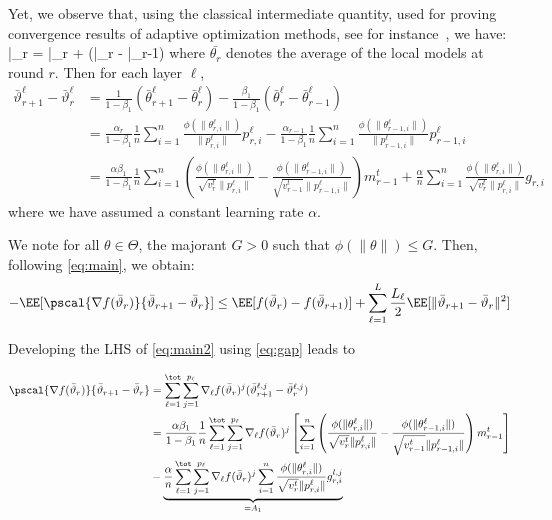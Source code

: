 \documentclass{article}
\begin{document}
Yet, we observe that, using the classical intermediate quantity, used for proving convergence results of adaptive optimization methods, see for instance~\citep{RKK18}, we have:
\beq\label{eq:defseq}
\bar{\vartheta}_r = \bar{\theta}_r +  (\bar{\theta}_{r} - \bar{\theta}_{r-1})
\eeq
where $\bar{\theta_r}$ denotes the average of the local models at round $r$.
Then for each layer $\ell$,
\begin{align}\label{eq:gap}
\bar{\vartheta}^\ell_{r+1} - \bar{\vartheta}^\ell_r  & = \frac{1}{1-\beta_1}(\bar{\theta}^\ell_{r+1} - \bar{\theta}^\ell_{r}) - \frac{\beta_1}{1-\beta_1}(\bar{\theta}^\ell_{r} - \bar{\theta}^\ell_{r-1})\\
& = \frac{\alpha_{r}}{1-\beta_1} \frac{1}{n} \sum_{i = 1}^n \frac{\phi(\|\theta_{r,i}^{\ell}\|)}{\|p_{r,i}^{\ell}\|} p_{r,i}^{\ell}  - \frac{\alpha_{r-1}}{1-\beta_1} \frac{1}{n} \sum_{i = 1}^n \frac{\phi(\|\theta_{r-1,i}^{\ell}\|)}{\|p_{r-1,i}^{\ell}\|} p_{r-1,i}^{\ell}\\
& = \frac{\alpha \beta_1}{1-\beta_1} \frac{1}{n}  \sum_{i = 1}^n  \left( \frac{\phi(\|\theta_{r,i}^{\ell}\|)}{\sqrt{v^{t}_{r}} \|p_{r,i}^{\ell}\|} - \frac{\phi(\|\theta_{r-1,i}^{\ell}\|)}{\sqrt{v^{t}_{r-1}} \|p_{r-1,i}^{\ell}\|} \right) m^{t}_{r-1} + \frac{\alpha}{n} \sum_{i = 1}^n \frac{\phi(\|\theta_{r,i}^{\ell}\|)}{\sqrt{v^{t}_{r}} \|p_{r,i}^{\ell}\|} g_{r,i}
\end{align}
where we have assumed a constant learning rate $\alpha$.


We note for all $\theta \in \Theta$, the majorant $G > 0$ such that $\phi(\|\theta \|) \leq G$. 
Then, following \eqref{eq:main}, we obtain:
\begin{align}\label{eq:main2}
- \EE[  \pscal{\nabla f(\bar{\vartheta}_r)}{\bar{\vartheta}_{r+1} - \bar{\vartheta}_r}]  \leq  \EE[ f(\bar{\vartheta}_r) - f(\bar{\vartheta}_{r+1})] + \sum_{\ell =1}^L \frac{L_\ell}{2} \EE[  \| \bar{\vartheta}_{r+1} - \bar{\vartheta}_r \|^2]
\end{align}

Developing the LHS of \eqref{eq:main2} using \eqref{eq:gap} leads to

\begin{align}\label{eq:inner}
\pscal{\nabla f(\bar{\vartheta}_r)}{\bar{\vartheta}_{r+1} - \bar{\vartheta}_r} &= \sum_{\ell=1}^\tot \sum_{j=1}^{p_\ell} \nabla_{\ell} f(\bar{\vartheta}_r)^j (\bar{\vartheta}^{\ell,j}_{r+1} - \bar{\vartheta}^{\ell,j}_r) \\
& =  \frac{\alpha \beta_1}{1-\beta_1}\frac{1}{n}  \sum_{\ell=1}^\tot \sum_{j=1}^{p_\ell} \nabla_{\ell} f(\bar{\vartheta}_r)^j \left[   \sum_{i = 1}^n  \left( \frac{\phi(\|\theta_{r,i}^{\ell}\|)}{\sqrt{v^{t}_{r}} \|p_{r,i}^{\ell}\|} - \frac{\phi(\|\theta_{r-1,i}^{\ell}\|)}{\sqrt{v^{t}_{r-1}} \|p_{r-1,i}^{\ell}\|} \right) m^{t}_{r-1}  \right] \\
& - \underbrace{ \frac{\alpha}{n} \sum_{\ell=1}^\tot \sum_{j=1}^{p_\ell} \nabla_{\ell} f(\bar{\vartheta}_r)^j  \sum_{i = 1}^n \frac{\phi(\|\theta_{r,i}^{\ell}\|)}{\sqrt{v^{t}_{r}} \|p_{r,i}^{\ell}\|} g_{r,i}^{l,j}}_{= A_1}   \label{eqn1}
\end{align}
\end{document}
